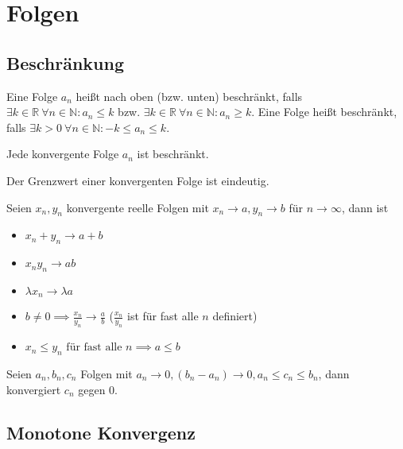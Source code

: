 \chapter{Folgen}

\section{Beschränkung}
\begin{definition}
  Eine Folge $a_n$ heißt nach oben (bzw. unten) beschränkt, falls $\exists k \in \mathbb{R}\: \forall n \in \mathbb{N}: a_n \le k$ bzw. $\exists k \in \mathbb{R}\: \forall n \in \mathbb{N}: a_n \ge k$. Eine Folge heißt beschränkt, falls $\exists k > 0\: \forall n \in \mathbb{N}: -k \le a_n \le k$.
\end{definition}

\begin{theorem}
  Jede konvergente Folge $a_n$ ist beschränkt.
\end{theorem}

\begin{theorem}
  Der Grenzwert einer konvergenten Folge ist eindeutig.
\end{theorem}

\begin{theorem}
  Seien $x_n, y_n$ konvergente reelle Folgen mit $x_n \to a, y_n \to b$ für $n \to \infty$, dann ist
  \begin{itemize}
  \item $x_n + y_n \to a+b$
  \item $x_n y_n \to ab$
  \item $\lambda x_n \to \lambda a$
  \item $b \ne 0 \implies \frac{x_n}{y_n} \to \frac{a}{b}$ ($\frac{x_n}{y_n}$ ist für fast alle $n$ definiert)
  \item $x_n \le y_n \text{ für fast alle $n$} \implies a \le b$
  \end{itemize}
\end{theorem}

\begin{theorem}
  Seien $a_n, b_n, c_n$ Folgen mit $a_n \to 0, (b_n - a_n) \to 0, a_n \le c_n \le b_n$, dann konvergiert $c_n$ gegen 0.
\end{theorem}

\section{Monotone Konvergenz}

